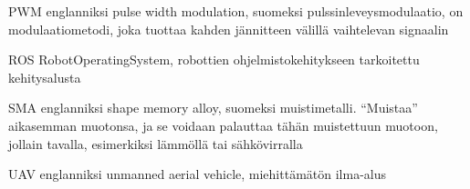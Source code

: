 \begin{termlist}
\item [PWM] englanniksi pulse width modulation, suomeksi
  pulssinleveysmodulaatio, on modulaatiometodi, joka tuottaa kahden jännitteen
  välillä vaihtelevan signaalin

\item [ROS] RobotOperatingSystem, robottien ohjelmistokehitykseen tarkoitettu
  kehitysalusta

\item [SMA] englanniksi shape memory alloy, suomeksi muistimetalli. ``Muistaa''
  aikasemman muotonsa, ja se voidaan palauttaa tähän muistettuun muotoon,
  jollain tavalla, esimerkiksi lämmöllä tai sähkövirralla

\item [UAV] englanniksi unmanned aerial vehicle, miehittämätön ilma-alus

\end{termlist} 
